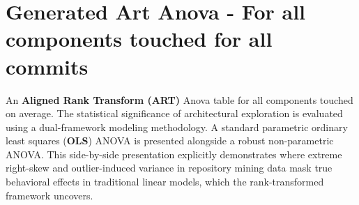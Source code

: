 \section{Generated Art Anova - For all components touched for all commits} 
\label{sec:codebase_graph_latex.repository_graph.component_time_series.generated_ART_anovaall commits} 
An \textbf{Aligned Rank Transform (ART)} Anova table for all components touched on average. 
The statistical significance of architectural exploration is evaluated using a dual-framework modeling methodology. A standard parametric ordinary least squares (\textbf{OLS}) ANOVA is presented alongside a robust non-parametric ANOVA. This side-by-side presentation explicitly demonstrates where extreme right-skew and outlier-induced variance in repository mining data mask true behavioral effects in traditional linear models, which the rank-transformed framework uncovers.

